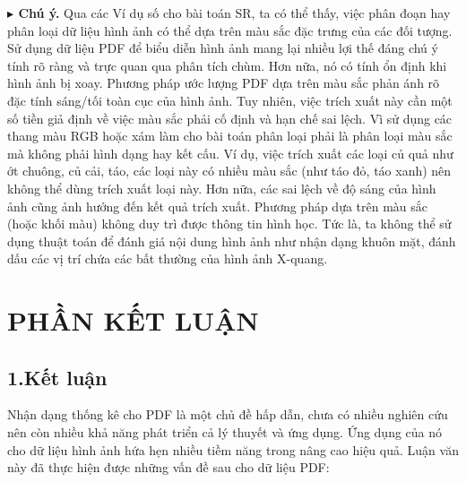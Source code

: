 \documentclass[a4paper,oneside]{book} %
\theoremstyle{plain}
\theoremstyle{plain}
\theoremstyle{nonumberplain}
\begin{document}
\textbf{$\blacktriangleright$ Chú ý.}
Qua các Ví dụ số cho bài toán SR, ta có thể thấy, việc phân đoạn hay phân loại dữ liệu hình ảnh có thể dựa trên màu sắc đặc trưng của các đối tượng. Sử dụng dữ liệu PDF để biểu diễn hình ảnh mang lại nhiều lợi thế đáng chú ý tính rõ ràng và trực quan qua phân tích chùm. Hơn nữa, nó có tính ổn định khi hình ảnh bị xoay. Phương pháp ước lượng PDF dựa trên màu sắc phản ánh rõ đặc tính sáng/tối toàn cục của hình ảnh.
Tuy nhiên, việc trích xuất này cần một số tiền giả định về việc màu sắc phải cố định và hạn chế sai lệch. Vì sử dụng các thang màu RGB hoặc xám làm cho bài toán phân loại phải là phân loại màu sắc mà không phải hình dạng hay kết cấu. Ví dụ, việc trích xuất các loại củ quả như ớt chuông, củ cải, táo, các loại này có nhiều màu sắc (như táo đỏ, táo xanh) nên không thể dùng trích xuất loại này. Hơn nữa, các sai lệch về độ sáng của hình ảnh cũng ảnh hưởng đến kết quả trích xuất.
Phương pháp dựa trên màu sắc (hoặc khối màu) không duy trì được thông tin hình học. Tức là, ta không thể sử dụng thuật toán để đánh giá nội dung hình ảnh như nhận dạng khuôn mặt, đánh dấu các vị trí chứa các bất thường của hình ảnh X-quang. 



%
%


\chapter*{PHẦN KẾT LUẬN}\label{chapter_ketluan}

\section*{1.\quad Kết luận}

Nhận dạng thống kê cho PDF là một chủ đề hấp dẫn, chưa có nhiều nghiên cứu nên còn nhiều khả năng phát triển cả lý thuyết và ứng dụng. Ứng dụng của nó cho dữ liệu hình ảnh hứa hẹn nhiều tiềm năng trong nâng cao hiệu quả. Luận văn này đã thực hiện được những vấn đề sau cho dữ liệu PDF:
\end{document}
